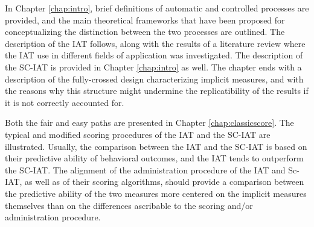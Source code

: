 \documentclass[12pt]{book}
\begin{document}
In Chapter \ref{chap:intro}, brief definitions of automatic and controlled processes are provided, and the main theoretical frameworks that have been proposed for conceptualizing the distinction between the two processes are outlined.  
The description of the IAT follows, along with the results of a literature review where the IAT use in different fields of application was investigated.
 The description of the SC-IAT is provided in Chapter \ref{chap:intro} as well. 
The chapter ends with a description of the fully-crossed design characterizing implicit measures, and with the reasons why this structure might undermine the replicatibility of the results if it is not correctly accounted for. 

Both the fair and easy paths are presented in Chapter \ref{chap:classicscore}.  
The typical and modified scoring procedures of the IAT and the SC-IAT are illustrated.
Usually, the comparison between the IAT and the SC-IAT is based on their predictive ability of behavioral outcomes, and the IAT tends to outperform the SC-IAT.
The alignment of the administration procedure of the IAT and Sc-IAT, as well as of their scoring algorithms, should provide a comparison between the predictive ability of the two measures more centered on the implicit measures themselves than on the differences ascribable to the scoring and/or administration procedure.

\end{document}
